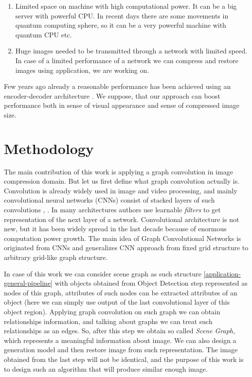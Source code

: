\begin{enumerate}
    \item Limited space on machine with high computational power. It can be a big server with powerful CPU. In recent days there are some movements in quantum computing sphere, so it can be a very powerful machine with quantum CPU etc.
    \item Huge images needed to be transmitted through a network with limited speed. In case of a limited performance of a network we can compress and restore images using application, we are working on.
\end{enumerate}

Few years ago already a reasonable performance has been achieved using an encoder-decoder architecture \cite{Theis_Shi_Cunningham_Huszar_2017}. We suppose, that our approach can boost performance both in sense of visual appearance and sense of compressed image size.

\chapter{Methodology}

The main contribution of this work is applying a graph convolution in image compression domain. But let us first define what graph convolution actually is. Convolution is already widely used in image and video processing, and mainly convolutional neural networks (CNNs) consist of stacked layers of such convolutions \cite{Krizhevsky_Sutskever_Hinton_2017}, \cite{Simonyan_Zisserman_2015}. In many architectures authors use learnable \textit{filters} to get representation of the next layer of a network. Convolutional architecture is not new, but it has been widely spread in the last decade because of enormous computation power growth. The main idea of Graph Convolutional Networks is originated from CNNs and generalizes CNN approach from fixed grid structure to arbitrary grid-like graph structure.

In case of this work we can consider scene graph as such structure \ref{application-general-pipeline} with objects obtained from Object Detection step represented as nodes of this graph, attributes of such nodes can be extracted attributes of an object (here we can simply use output of the last convolutional layer of this object region). Applying graph convolution on such graph we can obtain relationships information, and talking about graphs we can treat such relationships as an edges. So, after this step we obtain so called \textit{Scene Graph}, which represents a meaningful information about image. We can also design a generation model and then restore image from such representation. The image obtained from the last step will not be identical, and the purpose of this work is to design such an algorithm that will produce similar enough image.

